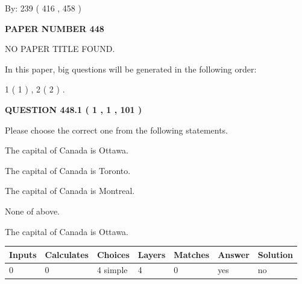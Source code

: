 \documentclass[12pt]{article}
\begin{document}
   
\hspace{1.0in} By: 
 239 ( 416 ,  458 )
   
   
   
   
\newpage 
\setcounter{page}{ 
   448001 } 
   
   
   
   
 {\textbf{ \Large{ PAPER NUMBER  448  }}}
   
   
\vspace{0.2in}
   
   
   
   
   
   
 NO PAPER TITLE FOUND.
   
   
   
\vspace{0.2in}
   
In this paper, big questions will be generated in the following order: 
   
   
   1 ( 1 )
 ,
   2 ( 2 )
 .
  
\vspace{0.2in}
  
{\textbf{\Large{QUESTION
448.1 
 ( 1 , 1 , 101 )
}}}
  
  
Please choose the correct one from the following statements.
 
 
The capital of Canada is Ottawa.
 
 
The capital of Canada is Toronto.
 
 
The capital of Canada is Montreal.
 
 
 None of above.
 
 
\noindent{}
 
 
The capital of Canada is Ottawa.
 
 
\noindent{}
 
 
   
   
   
   
\noindent\begin{tabular}{|l|l|l|l|l|l|l|}
 \hline
Inputs & Calculates & Choices & Layers & Matches & Answer & Solution \\ \hline
 0  & 
 0  & 
 4
  simple  
  & 
 4  & 
 0  & 
  yes & 
  no 
  \\ \hline
 \end{tabular}
   
\end{document}
